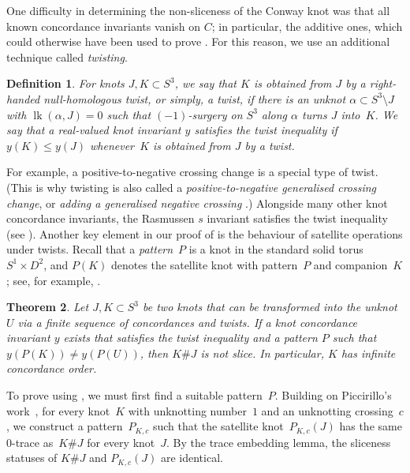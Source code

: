 \documentclass{amsart}
\newtheorem{theorem}{Theorem}%
\newtheorem{definition}[theorem]{Definition}
\theoremstyle{remark}
\DeclareMathOperator{\lk}{lk}
\begin{document}
One difficulty in determining the non-sliceness of the Conway knot was that 
all known concordance invariants vanish on $C$; in particular, the additive ones,
which could otherwise have been used to prove .  
For this reason, we use an additional technique called \emph{twisting}.

\begin{definition}\label{def:twist}
For knots $J, K\subset S^3$, we say that $K$ is obtained from $J$ by a \emph{right-handed null-homologous twist},
or simply, a \emph{twist}, if there is an unknot $\alpha \subset S^3\setminus J$ with $\lk(\alpha, J) = 0$ such that $(-1)$-surgery on $S^3$ along $\alpha$ turns $J$ into~$K$. 
We say that a real-valued knot invariant $y$ satisfies the \emph{twist inequality} if $y(K) \leq y(J)$ whenever~$K$ is obtained from $J$ by a twist.
\end{definition}

For example, a positive-to-negative crossing change is a special type of twist. (This is why twisting is also called a \emph{positive-to-negative generalised crossing change}, or \emph{adding a generalised negative crossing} \cite{zbMATH06339370}.) 
Alongside many other knot concordance invariants, the Rasmussen $s$ invariant satisfies the twist inequality (see ). Another key element in our proof of  is the behaviour of satellite operations under twists. Recall that a \emph{pattern}~$P$ is a knot in the standard solid torus~$S^1 \times D^2$, and $P(K)$ denotes the satellite knot with pattern~$P$ and companion~$K$; see, for example, \cite[Section 4D]{zbMATH00877622}. 

\begin{theorem}\label{thm:twist_ineq}
Let $J, K\subset S^3$ be two knots that can be transformed into the unknot~$U$ via a finite sequence of concordances and twists. 
If a knot concordance invariant $y$ exists that satisfies the twist inequality and a pattern $P$ such that ${y(P(K)) \neq y(P(U))}$, then $K \# J$ is not slice. 
In particular, $K$ has infinite concordance order.
\end{theorem}

To prove  using , we must first find a suitable pattern~$P$. Building on Piccirillo's work~\cite{piccirillo:shake-genus,piccirillo:Conway}, 
for every knot~$K$ with unknotting number~$1$ and an unknotting crossing~$c$, we construct a pattern~$P_{K,c}$ 
such that the satellite knot~$P_{K,c}(J)$ has the same $0$-trace as~$K \#J$ for every knot~$J$. By the trace embedding lemma, the sliceness statuses of $K\#J$ and $P_{K,c}(J)$ are identical. 
\end{document}
